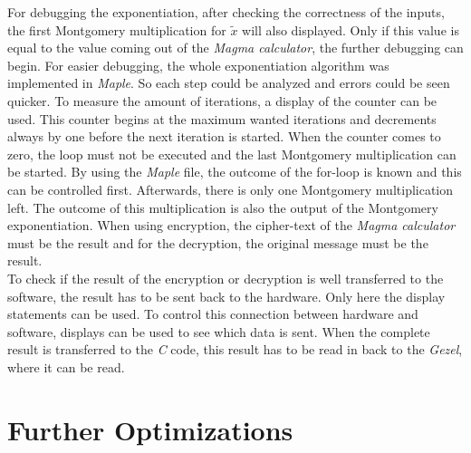\documentclass[a4paper]{article}
\begin{document}
For debugging the exponentiation, after checking the correctness of the inputs, the first Montgomery multiplication for $\tilde{x}$ will also displayed. Only if this value is equal to the value coming out of the \textit{Magma calculator}, the further debugging can begin. For easier debugging, the whole exponentiation algorithm was implemented in \textit{Maple}. So each step could be analyzed and errors could be seen quicker. To measure the amount of iterations, a display of the counter can be used. This counter begins at the maximum wanted iterations and decrements always by one before the next iteration is started. When the counter comes to zero, the loop must not be executed and the last Montgomery multiplication can be started. By using the \textit{Maple} file, the outcome of the for-loop is known and this can be controlled first. Afterwards, there is only one Montgomery multiplication left. The outcome of this multiplication is also the output of the Montgomery exponentiation. When using encryption, the cipher-text of the \textit{Magma calculator} must be the result and for the decryption, the original message must be the result.\\

To check if the result of the encryption or decryption is well transferred to the software, the result has to be sent back to the hardware. Only here the display statements can be used. To control this connection between hardware and software, displays can be used to see which data is sent. When the complete result is transferred to the \textit{C} code, this result has to be read in back to the \textit{Gezel}, where it can be read.

\section{Further Optimizations}
\end{document}
